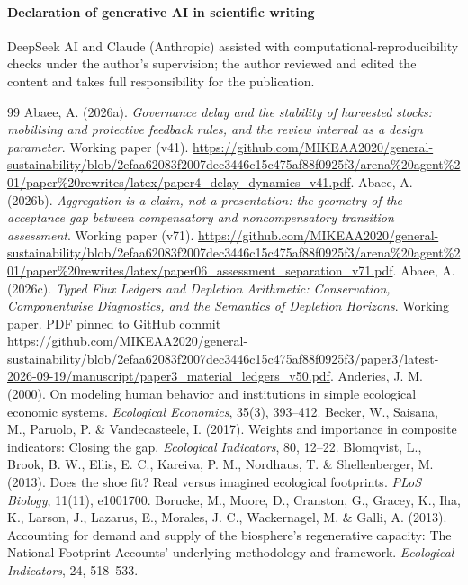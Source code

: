 \documentclass[preprint,12pt,authoryear]{elsarticle}
\begin{document}
\paragraph{Declaration of generative AI in scientific writing} DeepSeek AI and Claude (Anthropic) assisted with computational-reproducibility checks under the author's supervision; the author reviewed and edited the content and takes full responsibility for the publication.
\begin{thebibliography}{99}
 Abaee, A. (2026a). \emph{Governance delay and the stability of harvested stocks: mobilising and protective feedback rules, and the review interval as a design parameter}. Working paper (v41). \url{https://github.com/MIKEAA2020/general-sustainability/blob/2efaa62083f2007dec3446c15c475af88f0925f3/arena%20agent%201/paper%20rewrites/latex/paper4_delay_dynamics_v41.pdf}.
 Abaee, A. (2026b). \emph{Aggregation is a claim, not a presentation: the geometry of the acceptance gap between compensatory and noncompensatory transition assessment}. Working paper (v71). \url{https://github.com/MIKEAA2020/general-sustainability/blob/2efaa62083f2007dec3446c15c475af88f0925f3/arena%20agent%201/paper%20rewrites/latex/paper06_assessment_separation_v71.pdf}.
 Abaee, A. (2026c). \emph{Typed Flux Ledgers and Depletion Arithmetic: Conservation, Componentwise Diagnostics, and the Semantics of Depletion Horizons}. Working paper. PDF pinned to GitHub commit \url{https://github.com/MIKEAA2020/general-sustainability/blob/2efaa62083f2007dec3446c15c475af88f0925f3/paper3/latest-2026-09-19/manuscript/paper3_material_ledgers_v50.pdf}.
 Anderies, J. M. (2000). On modeling human behavior and institutions in simple ecological economic systems. \emph{Ecological Economics}, 35(3), 393--412.
 Becker, W., Saisana, M., Paruolo, P. \& Vandecasteele, I. (2017). Weights and importance in composite indicators: Closing the gap. \emph{Ecological Indicators}, 80, 12--22.
 Blomqvist, L., Brook, B. W., Ellis, E. C., Kareiva, P. M., Nordhaus, T. \& Shellenberger, M. (2013). Does the shoe fit? Real versus imagined ecological footprints. \emph{PLoS Biology}, 11(11), e1001700.
 Borucke, M., Moore, D., Cranston, G., Gracey, K., Iha, K., Larson, J., Lazarus, E., Morales, J. C., Wackernagel, M. \& Galli, A. (2013). Accounting for demand and supply of the biosphere's regenerative capacity: The National Footprint Accounts' underlying methodology and framework. \emph{Ecological Indicators}, 24, 518--533.

\end{thebibliography}
\end{document}
